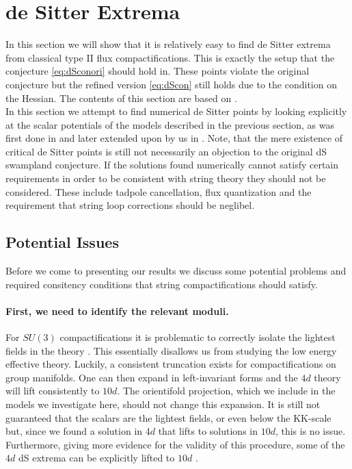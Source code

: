 \documentclass[12pt]{report}
\begin{document}
\section{de Sitter Extrema}
\label{sec:dSextrema}
In this section we will show that it is relatively easy to find de Sitter extrema from classical type II flux compactifications. This is exactly the setup that the conjecture \eqref{eq:dSconori} should hold in. These points violate the original conjecture but the refined version \eqref{eq:dScon} still holds due to the condition on the Hessian. The contents of this section are based on \cite{Roupec:2018mbn}.\\
In this section we attempt to find numerical de Sitter points by looking explicitly at the scalar potentials of the models described in the previous section, as was first done in \cite{Caviezel:2008tf,Flauger:2008ad} and later extended upon by us in \cite{Roupec:2018mbn}. Note, that the mere existence of critical de Sitter points is still not necessarily an objection to the original dS swampland conjecture. If the solutions found numerically cannot satisfy certain requirements in order to be consistent with string theory they should not be considered. These include tadpole cancellation, flux quantization and the requirement that string loop corrections should be neglibel.

\subsection{Potential Issues}
\label{sec:stringrequ}
Before we come to presenting our results we discuss some potential problems and required consitency conditions that string compactifications should satisfy.
\paragraph{First, we need to identify the relevant moduli.} For $SU(3)$ compactifications it is problematic to correctly isolate the lightest fields in the theory \cite{Kashani-Poor:2006ofe,Kashani-Poor:2007nby}. This essentially disallows us from studying the low energy effective theory. Luckily, a consistent truncation exists \cite{Cassani:2009ck} for compactifications on group manifolds. One can then expand in left-invariant forms and the $4d$ theory will lift consistently to $10d$. The orientifold projection, which we include in the models we investigate here, should not change this expansion. It is still not guaranteed that the scalars are the lightest fields, or even below the KK-scale \cite{Andriot:2018wzk} but, since we found a solution in $4d$ that lifts to solutions in $10d$, this is no issue. Furthermore, giving more evidence for the validity of this procedure, some of the $4d$ dS extrema can be explicitly lifted to $10d$ \cite{Danielsson:2010bc}.
\end{document}
